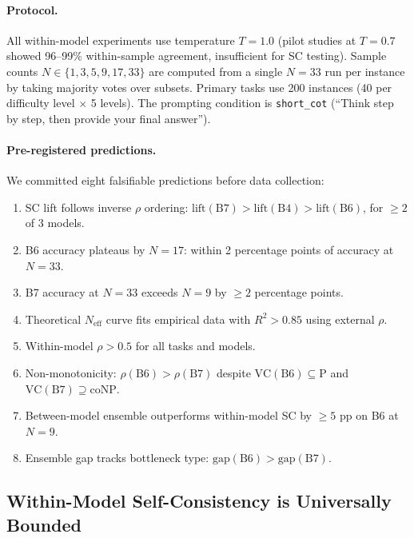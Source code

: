 \documentclass{article}
\theoremstyle{definition}
\theoremstyle{remark}
\newcommand{\PTIME}{\mathrm{P}}
\newcommand{\coNP}{\mathrm{coNP}}
\newcommand{\VC}{\mathrm{VC}}           %
\begin{document}
\paragraph{Protocol.}
All within-model experiments use temperature $T = 1.0$ (pilot studies at $T = 0.7$ showed 96--99\% within-sample agreement, insufficient for SC testing).
Sample counts $N \in \{1, 3, 5, 9, 17, 33\}$ are computed from a single $N = 33$ run per instance by taking majority votes over subsets.
Primary tasks use 200 instances (40 per difficulty level $\times$ 5 levels).
The prompting condition is \texttt{short\_cot} (``Think step by step, then provide your final answer'').

\paragraph{Pre-registered predictions.}
We committed eight falsifiable predictions before data collection:
\begin{enumerate}[label=\textbf{P\arabic*},leftmargin=*,itemsep=1pt]
    \item SC lift follows inverse $\rho$ ordering: $\text{lift}(\text{B7}) > \text{lift}(\text{B4}) > \text{lift}(\text{B6})$, for $\geq 2$ of 3 models.
    \item B6 accuracy plateaus by $N = 17$: within 2 percentage points of accuracy at $N = 33$.
    \item B7 accuracy at $N = 33$ exceeds $N = 9$ by $\geq 2$ percentage points.
    \item Theoretical $N_{\text{eff}}$ curve fits empirical data with $R^2 > 0.85$ using external $\rho$.
    \item Within-model $\rho > 0.5$ for all tasks and models.
    \item Non-monotonicity: $\rho(\text{B6}) > \rho(\text{B7})$ despite $\VC(\text{B6}) \subseteq \PTIME$ and $\VC(\text{B7}) \supseteq \coNP$.
    \item Between-model ensemble outperforms within-model SC by $\geq 5$ pp on B6 at $N = 9$.
    \item Ensemble gap tracks bottleneck type: $\text{gap}(\text{B6}) > \text{gap}(\text{B7})$.
\end{enumerate}

\subsection{Within-Model Self-Consistency is Universally Bounded}
\label{sec:exp_scaling}
\end{document}
